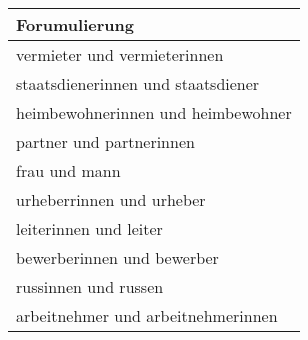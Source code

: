 
\begin{tabular}{l}
\toprule
Forumulierung\\
\midrule
vermieter und vermieterinnen\\
staatsdienerinnen und staatsdiener\\
heimbewohnerinnen und heimbewohner\\
partner und partnerinnen\\
frau und mann\\
urheberrinnen und urheber\\
leiterinnen und leiter\\
bewerberinnen und bewerber\\
russinnen und russen\\
arbeitnehmer und arbeitnehmerinnen\\
\bottomrule
\end{tabular}
